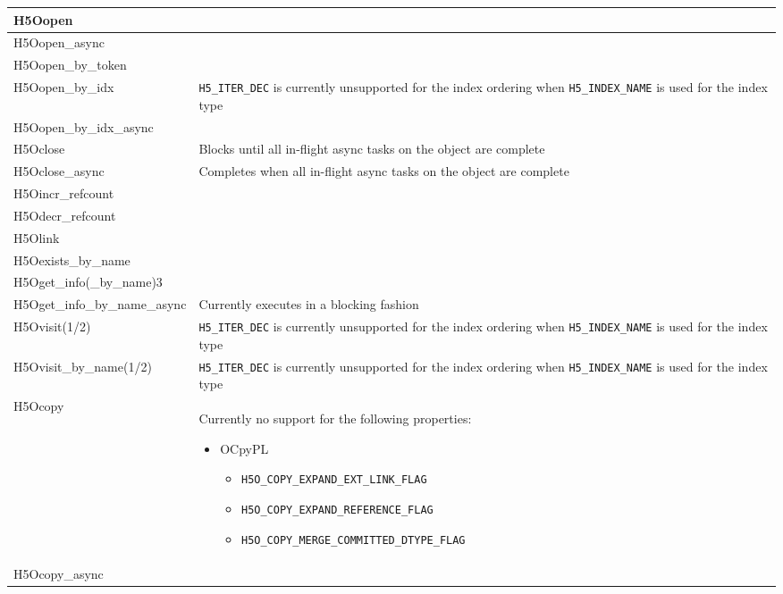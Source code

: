 \documentclass[../users_guide.tex]{subfiles}
\begin{document}
\begin{center}
\begin{tabularx}{\linewidth}{| X | >{\RaggedRight}X |}
H5Oopen & \\ \hline
H5Oopen\_async & \\ \hline
H5Oopen\_by\_token & \\ \hline
H5Oopen\_by\_idx & \texttt{H5\_ITER\_DEC} is currently unsupported for the index ordering when \texttt{H5\_INDEX\_NAME} is used for the index type\\ \hline
H5Oopen\_by\_idx\_async & \\ \hline
H5Oclose & Blocks until all in-flight async tasks on the object are complete\\ \hline
H5Oclose\_async & Completes when all in-flight async tasks on the object are complete\\ \hline
H5Oincr\_refcount & \\ \hline
H5Odecr\_refcount & \\ \hline
H5Olink & \\ \hline
H5Oexists\_by\_name & \\ \hline
H5Oget\_info(\_by\_name)3 & \\ \hline
H5Oget\_info\_by\_name\_async & Currently executes in a blocking fashion\\ \hline
H5Ovisit(1/2) & \texttt{H5\_ITER\_DEC} is currently unsupported for the index ordering when \texttt{H5\_INDEX\_NAME} is used for the index type\\ \hline
H5Ovisit\_by\_name(1/2) & \texttt{H5\_ITER\_DEC} is currently unsupported for the index ordering when \texttt{H5\_INDEX\_NAME} is used for the index type\\ \hline
H5Ocopy & Currently no support for the following properties: \begin{itemize}
                                                                 \setlength{\itemindent}{-1em}
                                                                 \item OCpyPL
                                                                 \begin{itemize}
                                                                     \setlength{\itemindent}{-2.5em}
                                                                     \item {\small\texttt{H5O\_COPY\_EXPAND\_EXT\_LINK\_FLAG}}\footnotemark[1]
                                                                     \item {\small\texttt{H5O\_COPY\_EXPAND\_REFERENCE\_FLAG}}\footnotemark[2]
                                                                     \item {\small\texttt{H5O\_COPY\_MERGE\_COMMITTED\_DTYPE\_FLAG}}
                                                                 \end{itemize}
                                                             \end{itemize}\\ \hline
H5Ocopy\_async & \\ \hline


\end{tabularx}
\end{center}
\end{document}
